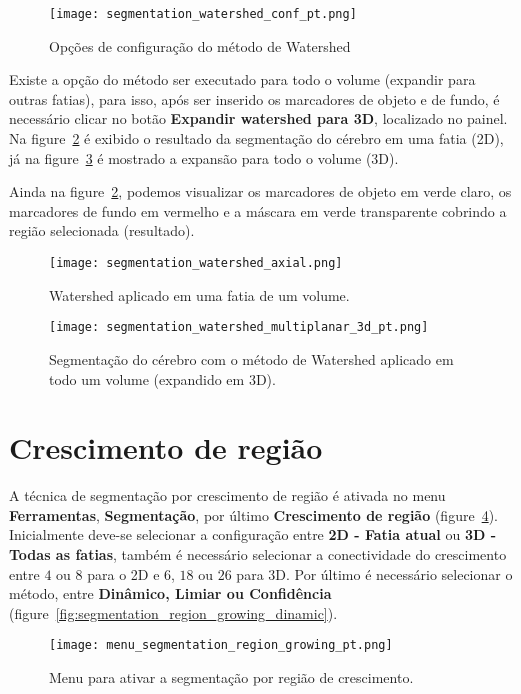 \begin{figure}[!htb]
\centering
\texttt{[image: segmentation\_watershed\_conf\_pt.png]}
\caption{Opções de configuração do método de Watershed}
\label{fig:watershed_janela_conf}
\end{figure}

Existe a opção do método ser executado para todo o volume (expandir para outras fatias), para isso, após ser inserido os marcadores de objeto e de fundo, é necessário clicar no botão \textbf{Expandir watershed para 3D}, localizado no painel. Na figure~\ref{fig:watershed_2d} é exibido o resultado da segmentação do cérebro em uma fatia (2D), já na figure~\ref{fig:watershed_3d} é mostrado a expansão para todo o volume (3D). 

Ainda na figure~\ref{fig:watershed_2d}, podemos visualizar os marcadores de objeto em verde claro, os marcadores de fundo em vermelho e a máscara em verde transparente cobrindo a região selecionada (resultado).

\begin{figure}[!htb]
\centering
\texttt{[image: segmentation\_watershed\_axial.png]}
\caption{Watershed aplicado em uma fatia de um volume.}
\label{fig:watershed_2d}
\end{figure}

\begin{figure}[!htb]
\centering
\texttt{[image: segmentation\_watershed\_multiplanar\_3d\_pt.png]}
\caption{Segmentação do cérebro com o método de Watershed aplicado em todo um volume (expandido em 3D).}
\label{fig:watershed_3d}
\end{figure}

\section{Crescimento de região}

A técnica de segmentação por crescimento de região é ativada no menu \textbf{Ferramentas}, \textbf{Segmentação}, por último \textbf{Crescimento de região} (figure~\ref{fig:menu_segmentation_region_growing}). Inicialmente deve-se selecionar a configuração entre \textbf{2D - Fatia atual} ou \textbf{3D - Todas as fatias}, também é necessário selecionar a conectividade do crescimento entre $4$ ou $8$ para o 2D e $6$, $18$ ou $26$ para 3D. Por último é necessário selecionar o método, entre \textbf{Dinâmico, Limiar ou Confidência} (figure~\ref{fig:segmentation_region_growing_dinamic}).

\begin{figure}[!htb]
\centering
\texttt{[image: menu\_segmentation\_region\_growing\_pt.png]}
\caption{Menu para ativar a segmentação por região de crescimento.}
\label{fig:menu_segmentation_region_growing}
\end{figure}

